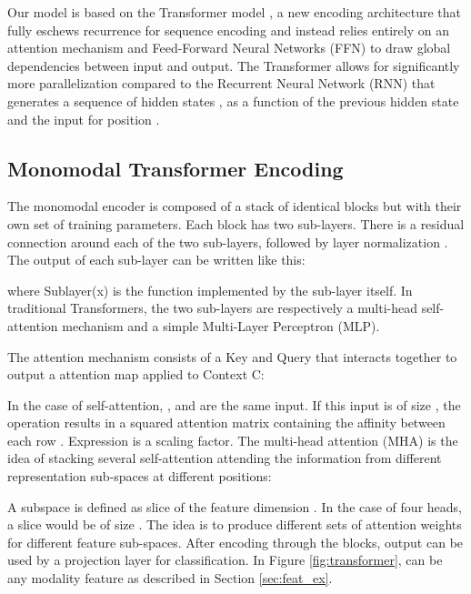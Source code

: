 \documentclass[11pt,a4paper]{article}
\begin{document}
Our model is based on the Transformer model \cite{vaswani2017attention}, a new encoding architecture that fully eschews recurrence for sequence encoding and instead relies entirely on an attention mechanism and Feed-Forward Neural Networks (FFN) to draw global dependencies between input and output. The Transformer allows for significantly more parallelization compared to the Recurrent Neural Network (RNN) that generates a sequence of hidden states , as a function of the previous hidden state  and the input for position . \\

\subsection{Monomodal Transformer Encoding}
\label{sec:mono}
The monomodal encoder is composed of a stack of  identical blocks but with their own set of training parameters. Each block has two
sub-layers. There is a residual connection around each of the two sub-layers, followed by layer normalization \cite{ba2016layer}. The output of each sub-layer can be written like this:

where Sublayer(x) is the function implemented by the sub-layer itself. In traditional Transformers, the two sub-layers are respectively a multi-head self-attention mechanism and a simple Multi-Layer Perceptron (MLP).

The attention mechanism consists of a Key  and Query  that interacts together to output a attention map applied to Context C:

In the case of self-attention, ,  and  are the same input. If this input is of size , the operation  results in a squared attention matrix containing the affinity between each row . Expression  is a scaling factor. The multi-head attention (MHA) is the idea of stacking several self-attention attending the information from different representation sub-spaces at different positions:



A subspace is defined as slice of the feature dimension . In the case of four heads, a slice would be of size . The idea is to produce different sets of attention weights for different feature sub-spaces.
After encoding through the blocks, output  can be used by a projection layer for classification. In Figure \ref{fig:transformer},  can be any modality feature as described in Section \ref{sec:feat_ex}.
\end{document}
